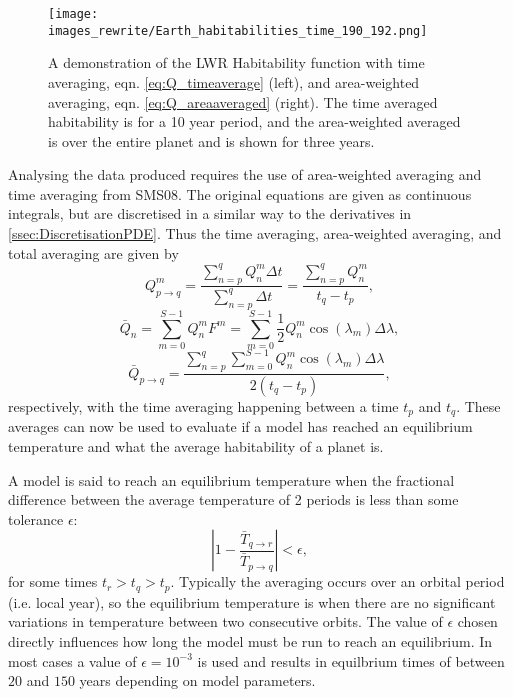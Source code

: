 \documentclass[12pt, onecolumn]{revtex4-2}    %
\begin{document}
\begin{figure}
  \texttt{[image: images\_rewrite/Earth\_habitabilities\_time\_190\_192.png]}
  \caption{
    A demonstration of the LWR Habitability function with time averaging, eqn. \eqref{eq:Q_timeaverage} (left), and area-weighted averaging, eqn. \eqref{eq:Q_areaaveraged} (right).
    The time averaged habitability is for a 10 year period, and the area-weighted averaged is over the entire planet and is shown for three years.
  }
  \label{fig:time_area_habitability_demonstration}
\end{figure}

Analysing the data produced requires the use of area-weighted averaging and time averaging from SMS08.
The original equations are given as continuous integrals, but are discretised in a similar way to the derivatives in \ref{ssec:DiscretisationPDE}.
Thus the time averaging, area-weighted averaging, and total averaging are given by
\begin{equation}
    Q^m_{p \to q}  = \frac{\sum_{n=p}^{q} Q^m_n \Delta t} {\sum_{n=p}^{q} \Delta t} 
                   = \frac{\sum_{n=p}^{q} Q^m_n}{t_q-t_p},
  \label{eq:Q_timeaverage}
\end{equation}
\begin{equation}
  \bar{Q}_n = \sum_{m=0}^{S-1} Q^m_n F^m = \sum_{m = 0}^{S-1} \frac{1}{2}Q^m_n \cos(\lambda_m) \Delta\lambda,
  \label{eq:Q_areaaveraged}
\end{equation}
\begin{equation}
  \bar{Q}_{p \to q} = \frac{\sum_{n=p}^{q} \sum_{m = 0}^{S-1} Q^m_n \cos(\lambda_m) \Delta\lambda}{2(t_q-t_p)},
  \label{eq:Q_totalaverage}
\end{equation}
respectively, with the time averaging happening between a time $t_p$ and $t_q$.
These averages can now be used to evaluate if a model has reached an equilibrium temperature and what the average habitability of a planet is.

A model is said to reach an equilibrium temperature when the fractional difference between the average temperature of 2 periods is less than some tolerance $\epsilon$:
\begin{equation}
  \left|1 - \frac{\bar{T}_{q \to r}}{\bar{T}_{p \to q}}\right| < \epsilon,
  \label{eq:T_equilb}
\end{equation}
for some times $t_r > t_q > t_p$.
Typically the averaging occurs over an orbital period (i.e. local year), so the equilibrium temperature is when there are no significant variations in temperature between two consecutive orbits.
The value of $\epsilon$ chosen directly influences how long the model must be run to reach an equilibrium.
In most cases a value of $\epsilon = 10^{-3}$ is used and results in equilbrium times of between $20$ and $150$ years depending on model parameters.
\end{document}
